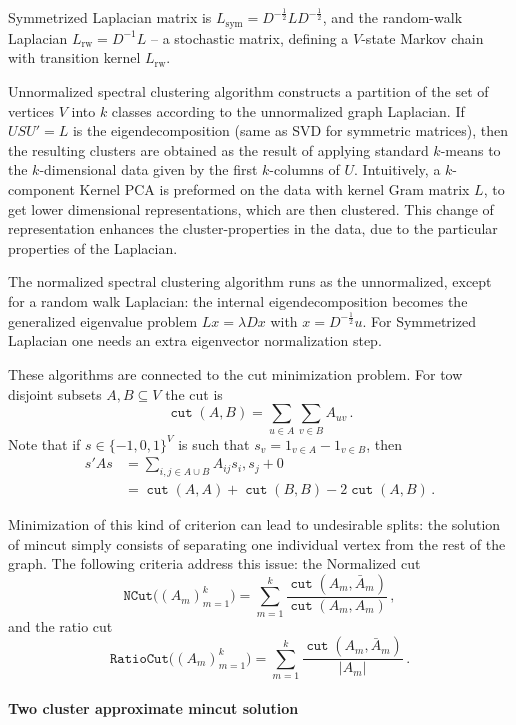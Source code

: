 \documentclass[a4paper,14pt]{extarticle}
\newcommand{\cut}{\mathop{\mathtt{cut}}\nolimits}
\begin{document}
Symmetrized Laplacian matrix is $L_\text{sym} = D^{-\frac{1}{2}} L D^{-\frac{1}{2}}$,
and the random-walk Laplacian $L_\text{rw} = D^{-1} L$ -- a stochastic matrix, defining
a $V$-state Markov chain with transition kernel $L_\text{rw}$.

Unnormalized spectral clustering algorithm constructs a partition of the set of
vertices $V$ into $k$ classes according to the unnormalized graph Laplacian. If
$USU' = L$ is the eigendecomposition (same as SVD for symmetric matrices), then
the resulting clusters are obtained as the result of applying standard $k$-means
to the $k$-dimensional data given by the first $k$-columns of $U$. Intuitively,
a $k$-component Kernel PCA is preformed on the data with kernel Gram matrix $L$,
to get lower dimensional representations, which are then clustered. This change
of representation enhances the cluster-properties in the data, due to the particular
properties of the Laplacian. 

The normalized spectral clustering algorithm runs as the unnormalized, except for
a random walk Laplacian: the internal eigendecomposition becomes the generalized
eigenvalue problem $L x = \lambda D x$ with $x = D^{-\frac{1}{2}} u$. For Symmetrized
Laplacian one needs an extra eigenvector normalization step.

These algorithms are connected to the cut minimization problem. For tow disjoint
subsets $A,B\subseteq V$ the cut is 
$$ \cut(A,B) = \sum_{u\in A} \sum_{v\in B} A_{uv} \,. $$
Note that if $s\in \{-1, 0,1\}^V$ is such that $s_v = 1_{v\in A} - 1_{v\in B}$, then
\begin{align*}
s' A s
    &= \sum_{i,j\in A\cup B} A_{ij} s_i, s_j + 0\\
    &= \cut(A, A) + \cut(B, B) - 2\cut(A,B) \,.
\end{align*}

Minimization of this kind of criterion can lead to undesirable splits: the solution
of mincut simply consists of separating one individual vertex from the rest of the
graph. The following criteria address this issue: the Normalized cut
$$ \mathtt{NCut}\bigl((A_m)_{m=1}^k\bigr)
    = \sum_{m=1}^k \frac{\cut(A_m,\bar{A}_m)}{\cut(A_m,A_m)}
    \,, $$
and the ratio cut
$$ \mathtt{RatioCut}\bigl((A_m)_{m=1}^k\bigr)
    = \sum_{m=1}^k \frac{\cut(A_m,\bar{A}_m)}{|A_m|}
    \,. $$

\paragraph{Two cluster approximate mincut solution} %
\label{par:two_cluster_approximate_mincut_solution}
\end{document}
